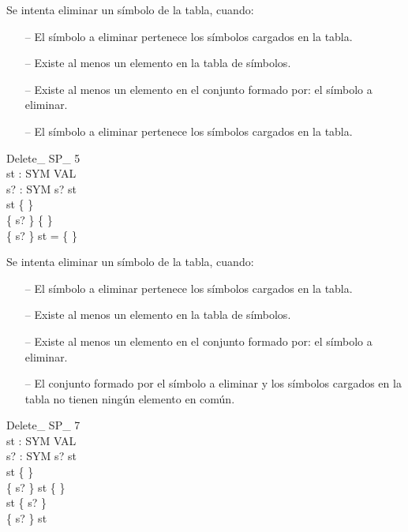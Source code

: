 \begin{tcolorbox}[colback=gray!5!white,colframe=gray!50!black,
  colbacktitle=gray!75!black,title=Delete\_ SP\_ 4]
  Se intenta eliminar un símbolo de la tabla, cuando:
     \begin{itemize}
        \item[--]{El símbolo a eliminar pertenece los símbolos cargados en la tabla.}
        \item[--]{Existe al menos un elemento en la tabla de símbolos.}
        \item[--]{Existe al menos un elemento en el conjunto formado por: el símbolo a eliminar.}
        \item[--]{El símbolo a eliminar pertenece los símbolos cargados en la tabla.}
     \end{itemize}
\end{tcolorbox}


\begin{schema}{Delete\_ SP\_ 5}\\
 st : SYM \pfun VAL \\
 s? : SYM 
\where
 s? \in \dom st \\
 st \neq \{ \} \\
 \{ s? \} \neq \{ \} \\
 \{ s? \} \cap \dom st = \{ \}
\end{schema}

\begin{tcolorbox}[colback=gray!5!white,colframe=gray!50!black,
  colbacktitle=gray!75!black,title=Delete\_ SP\_ 5]
  Se intenta eliminar un símbolo de la tabla, cuando:
     \begin{itemize}
        \item[--]{El símbolo a eliminar pertenece los símbolos cargados en la tabla.}
        \item[--]{Existe al menos un elemento en la tabla de símbolos.}
        \item[--]{Existe al menos un elemento en el conjunto formado por: el símbolo a eliminar.}
        \item[--]{El conjunto formado por el símbolo a eliminar y los símbolos cargados en la tabla no tienen ningún elemento en común.}
     \end{itemize}
\end{tcolorbox}


\begin{schema}{Delete\_ SP\_ 7}\\
 st : SYM \pfun VAL \\
 s? : SYM 
\where
 s? \in \dom st \\
 st \neq \{ \} \\
 \{ s? \} \cap \dom st \neq \{ \} \\
 \lnot \dom st \subseteq \{ s? \} \\
 \lnot \{ s? \} \subseteq \dom st
\end{schema}

